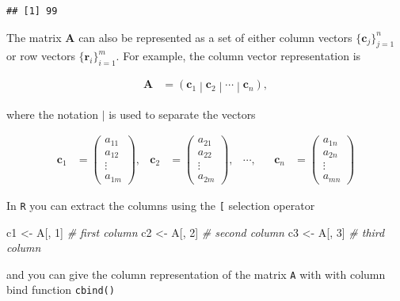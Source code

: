 \documentclass[
]{book}
\newenvironment{Shaded}{\begin{snugshade}}{\end{snugshade}}
\newcommand{\CommentTok}[1]{\textcolor[rgb]{0.56,0.35,0.01}{\textit{#1}}}
\newcommand{\DecValTok}[1]{\textcolor[rgb]{0.00,0.00,0.81}{#1}}
\newcommand{\NormalTok}[1]{#1}
\newcommand{\StringTok}[1]{\textcolor[rgb]{0.31,0.60,0.02}{#1}}
\theoremstyle{definition}
\theoremstyle{definition}
\theoremstyle{definition}
\theoremstyle{definition}
\theoremstyle{remark}
\begin{document}
\begin{verbatim}
## [1] 99
\end{verbatim}

The matrix \(\mathbf{A}\) can also be represented as a set of either column vectors \(\{\mathbf{c}_j \}_{j=1}^n\) or row vectors \(\{\mathbf{r}_i \}_{i=1}^m\). For example, the column vector representation is

\[
\begin{aligned}
\mathbf{A} & = \left( \mathbf{c}_{1} \middle| \mathbf{c}_{2} \middle| \cdots \middle| \mathbf{c}_{n} \right),
\end{aligned}
\]

where the notation \(|\) is used to separate the vectors

\[
\begin{aligned}
\mathbf{c}_1 & = \begin{pmatrix} a_{11} \\ a_{12} \\ \vdots \\ a_{1m}
\end{pmatrix},
& \mathbf{c}_2 & = \begin{pmatrix} a_{21} \\ a_{22} \\ \vdots \\ a_{2m}
\end{pmatrix}, 
& \cdots, &
& \mathbf{c}_n & = \begin{pmatrix} a_{1n} \\ a_{2n} \\ \vdots \\ a_{mn}
\end{pmatrix}
\end{aligned}
\]

In \texttt{R} you can extract the columns using the \texttt{{[}} selection operator

\begin{Shaded}
\begin{Highlighting}[]
\NormalTok{c1 <-}\StringTok{ }\NormalTok{A[, }\DecValTok{1}\NormalTok{] }\CommentTok{# first column}
\NormalTok{c2 <-}\StringTok{ }\NormalTok{A[, }\DecValTok{2}\NormalTok{] }\CommentTok{# second column}
\NormalTok{c3 <-}\StringTok{ }\NormalTok{A[, }\DecValTok{3}\NormalTok{] }\CommentTok{# third column}
\end{Highlighting}
\end{Shaded}

and you can give the column representation of the matrix \texttt{A} with with column bind function \texttt{cbind()}
\end{document}
